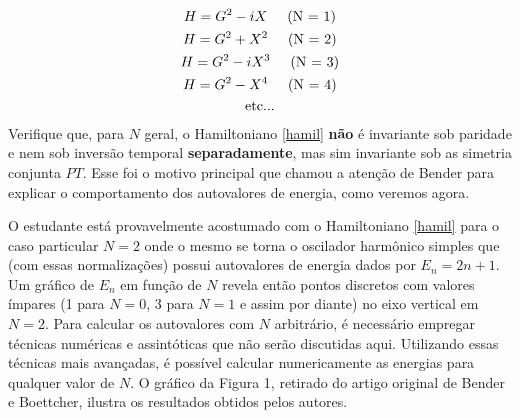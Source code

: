 \documentclass{article}
\begin{document}
\begin{subequations}
\begin{gather}
    H = G^2 - iX \hspace{0.5cm}\text{(N = 1)} \\
    H = G^2 + X^2 \hspace{0.5cm}\text{(N = 2)} \\
    H = G^2 - iX^3 \hspace{0.5cm}\text{(N = 3)}  \\
    H = G^2 - X^4 \hspace{0.5cm}\text{(N = 4)}   \\ 
    \text{etc...}
\end{gather}
\end{subequations}
Verifique que, para $N$ geral, o Hamiltoniano \eqref{hamil} \textbf{não} é invariante sob paridade e nem sob inversão temporal \textbf{separadamente}, mas sim invariante sob as simetria conjunta $PT$. Esse foi o motivo principal que chamou a atenção de Bender para explicar o comportamento dos autovalores de energia, como veremos agora.

O estudante está provavelmente acostumado com o Hamiltoniano \eqref{hamil} para o caso particular $N = 2$ onde o mesmo se torna o oscilador harmônico simples que (com essas normalizações) possui autovalores de energia dados por $E_n = 2n + 1$. Um gráfico de $E_n$ em função de $N$ revela então pontos discretos com valores ímpares (1 para $N = 0$, 3 para $N = 1$ e assim por diante) no eixo vertical em $N = 2$. Para calcular os autovalores com $N$ arbitrário, é necessário empregar técnicas numéricas e assintóticas que não serão discutidas aqui. Utilizando essas técnicas mais avançadas, é possível calcular numericamente as energias para qualquer valor de $N$. O gráfico da Figura 1, retirado do artigo original de Bender e Boettcher, ilustra os resultados obtidos pelos autores.
\end{document}
